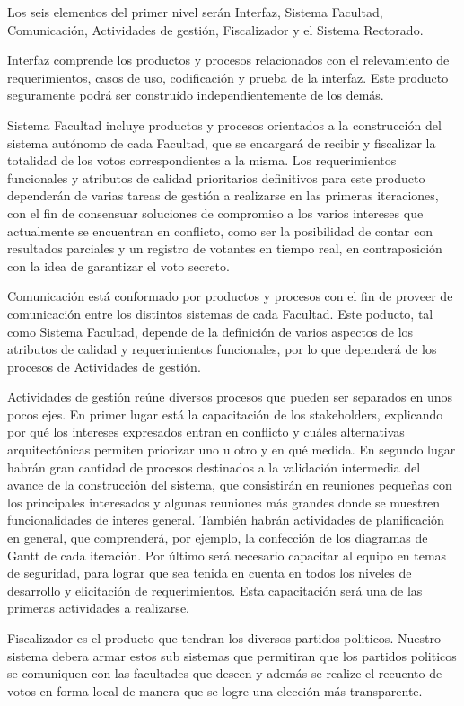 Los seis elementos del primer nivel serán Interfaz, Sistema Facultad, Comunicación, Actividades de gestión, Fiscalizador y el Sistema Rectorado.

Interfaz comprende los productos y procesos relacionados con el relevamiento de requerimientos, casos de uso, codificación y prueba de la interfaz. Este producto seguramente podrá ser construído independientemente de los demás.

Sistema Facultad incluye productos y procesos orientados a la construcción del sistema autónomo de cada Facultad, que se encargará de recibir y fiscalizar la totalidad de los votos correspondientes a la misma. Los requerimientos funcionales y atributos de calidad prioritarios definitivos para este producto dependerán de varias tareas de gestión a realizarse en las primeras iteraciones, con el fin de consensuar soluciones de compromiso a los varios intereses que actualmente se encuentran en conflicto, como ser la posibilidad de contar con resultados parciales y un registro de votantes en tiempo real, en contraposición con la idea de garantizar el voto secreto.

Comunicación está conformado por productos y procesos con el fin de proveer de comunicación entre los distintos sistemas de cada Facultad. Este poducto, tal como Sistema Facultad, depende de la definición de varios aspectos de los atributos de calidad y requerimientos funcionales, por lo que dependerá de los procesos de Actividades de gestión.

Actividades de gestión reúne diversos procesos que pueden ser separados en unos pocos ejes. En primer lugar está la capacitación de los stakeholders, explicando por qué los intereses expresados entran en conflicto y cuáles alternativas arquitectónicas permiten priorizar uno u otro y en qué medida.
En segundo lugar habrán gran cantidad de procesos destinados a la validación intermedia del avance de la construcción del sistema, que consistirán en reuniones pequeñas con los principales interesados y algunas reuniones más grandes donde se muestren funcionalidades de interes general.
También habrán actividades de planificación en general, que comprenderá, por ejemplo, la confección de los diagramas de Gantt de cada iteración.
Por último será necesario capacitar al equipo en temas de seguridad, para lograr que sea tenida en cuenta en todos los niveles de desarrollo y elicitación de requerimientos. Esta capacitación será una de las primeras actividades a realizarse.

Fiscalizador es el producto que tendran los diversos partidos politicos. Nuestro sistema debera armar estos sub sistemas que permitiran que los partidos politicos se comuniquen con las facultades que deseen y además se realize el recuento de votos en forma local de manera que se logre una elección más transparente. 

